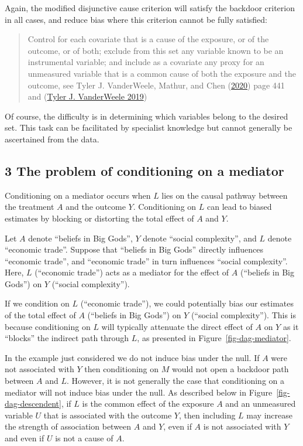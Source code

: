\documentclass[
  singlecolumn]{report}
\begin{document}
Again, the modified disjunctive cause criterion will satisfy the
backdoor criterion in all cases, and reduce bias where this criterion
cannot be fully satisfied:

\begin{quote}
Control for each covariate that is a cause of the exposure, or of the
outcome, or of both; exclude from this set any variable known to be an
instrumental variable; and include as a covariate any proxy for an
unmeasured variable that is a common cause of both the exposure and the
outcome, see Tyler J. VanderWeele, Mathur, and Chen
(\protect\hyperlink{ref-vanderweele2020}{2020}) page 441 and
(\protect\hyperlink{ref-vanderweele2019a}{Tyler J. VanderWeele 2019})
\end{quote}

Of course, the difficulty is in determining which variables belong to
the desired set. This task can be facilitated by specialist knowledge
but cannot generally be ascertained from the data.

\hypertarget{the-problem-of-conditioning-on-a-mediator}{%
\subsection{3 The problem of conditioning on a
mediator}\label{the-problem-of-conditioning-on-a-mediator}}

Conditioning on a mediator occurs when \(L\) lies on the causal pathway
between the treatment \(A\) and the outcome \(Y\). Conditioning on \(L\)
can lead to biased estimates by blocking or distorting the total effect
of \(A\) and \(Y\).

Let \(A\) denote ``beliefs in Big Gods'', \(Y\) denote ``social
complexity'', and \(L\) denote ``economic trade''. Suppose that
``beliefs in Big Gods'' directly influences ``economic trade'', and
``economic trade'' in turn influences ``social complexity''. Here, \(L\)
(``economic trade'') acts as a mediator for the effect of \(A\)
(``beliefs in Big Gods'') on \(Y\) (``social complexity'').

If we condition on \(L\) (``economic trade''), we could potentially bias
our estimates of the total effect of \(A\) (``beliefs in Big Gods'') on
\(Y\) (``social complexity''). This is because conditioning on \(L\)
will typically attenuate the direct effect of \(A\) on \(Y\) as it
``blocks'' the indirect path through \(L\), as presented in
Figure~\ref{fig-dag-mediator}.

In the example just considered we do not induce bias under the null. If
\(A\) were not associated with \(Y\) then conditioning on \(M\) would
not open a backdoor path between \(A\) and \(L\). However, it is not
generally the case that conditioning on a mediator will not induce bias
under the null. As described below in Figure~\ref{fig-dag-descendent},
if \(L\) is the common effect of the exposure \(A\) and an unmeasured
variable \(U\) that is associated with the outcome \(Y\), then including
\(L\) may increase the strength of association between \(A\) and \(Y\),
even if \(A\) is not associated with \(Y\) and even if \(U\) is not a
cause of \(A\).
\end{document}
